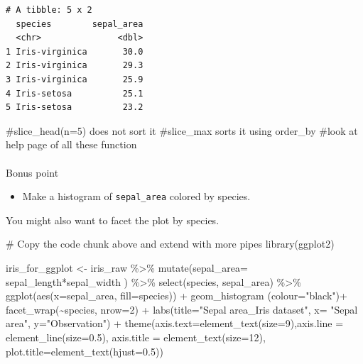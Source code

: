 \documentclass[
  letterpaper,
  DIV=11,
  numbers=noendperiod]{scrartcl}
\makeatletter
\let\oldparagraph\paragraph
\renewcommand{\paragraph}{
    \@ifstar
      \xxxParagraphStar
      \xxxParagraphNoStar
  }
\newcommand{\xxxParagraphStar}[1]{\oldparagraph*{#1}\mbox{}}
\newcommand{\xxxParagraphNoStar}[1]{\oldparagraph{#1}\mbox{}}
\newenvironment{Shaded}{\begin{snugshade}}{\end{snugshade}}
\newcommand{\AttributeTok}[1]{\textcolor[rgb]{0.40,0.45,0.13}{#1}}
\newcommand{\CommentTok}[1]{\textcolor[rgb]{0.37,0.37,0.37}{#1}}
\newcommand{\DecValTok}[1]{\textcolor[rgb]{0.68,0.00,0.00}{#1}}
\newcommand{\FloatTok}[1]{\textcolor[rgb]{0.68,0.00,0.00}{#1}}
\newcommand{\FunctionTok}[1]{\textcolor[rgb]{0.28,0.35,0.67}{#1}}
\newcommand{\NormalTok}[1]{\textcolor[rgb]{0.00,0.23,0.31}{#1}}
\newcommand{\OtherTok}[1]{\textcolor[rgb]{0.00,0.23,0.31}{#1}}
\newcommand{\SpecialCharTok}[1]{\textcolor[rgb]{0.37,0.37,0.37}{#1}}
\newcommand{\StringTok}[1]{\textcolor[rgb]{0.13,0.47,0.30}{#1}}
\providecommand{\tightlist}{%
  \setlength{\itemsep}{0pt}\setlength{\parskip}{0pt}}\usepackage{longtable,booktabs,array}
\makeatother
\begin{document}
\begin{verbatim}
# A tibble: 5 x 2
  species        sepal_area
  <chr>               <dbl>
1 Iris-virginica       30.0
2 Iris-virginica       29.3
3 Iris-virginica       25.9
4 Iris-setosa          25.1
5 Iris-setosa          23.2
\end{verbatim}

\begin{Shaded}
\begin{Highlighting}[]
\CommentTok{\#slice\_head(n=5) does not sort it}
\CommentTok{\#slice\_max sorts it using order\_by}
\CommentTok{\#look at help page of all these function}
\end{Highlighting}
\end{Shaded}

\paragraph{Bonus point}\label{bonus-point}

\begin{itemize}
\tightlist
\item
  Make a histogram of \texttt{sepal\_area} colored by species.
\end{itemize}

You might also want to facet the plot by species.

\begin{Shaded}
\begin{Highlighting}[]
\CommentTok{\# Copy the code chunk above and extend with more pipes}
\FunctionTok{library}\NormalTok{(ggplot2)}

\NormalTok{iris\_for\_ggplot }\OtherTok{\textless{}{-}}\NormalTok{ iris\_raw }\SpecialCharTok{\%\textgreater{}\%}
  \FunctionTok{mutate}\NormalTok{(}\AttributeTok{sepal\_area=}\NormalTok{ sepal\_length}\SpecialCharTok{*}\NormalTok{sepal\_width ) }\SpecialCharTok{\%\textgreater{}\%} 
  \FunctionTok{select}\NormalTok{(species, sepal\_area) }\SpecialCharTok{\%\textgreater{}\%} 
  \FunctionTok{ggplot}\NormalTok{(}\FunctionTok{aes}\NormalTok{(}\AttributeTok{x=}\NormalTok{sepal\_area, }\AttributeTok{fill=}\NormalTok{species)) }\SpecialCharTok{+} 
  \FunctionTok{geom\_histogram}\NormalTok{ (}\AttributeTok{colour=}\StringTok{"black"}\NormalTok{)}\SpecialCharTok{+} 
  \FunctionTok{facet\_wrap}\NormalTok{(}\SpecialCharTok{\textasciitilde{}}\NormalTok{species, }\AttributeTok{nrow=}\DecValTok{2}\NormalTok{) }\SpecialCharTok{+}
  \FunctionTok{labs}\NormalTok{(}\AttributeTok{title=}\StringTok{"Sepal area\_Iris dataset"}\NormalTok{, }\AttributeTok{x=} \StringTok{"Sepal area"}\NormalTok{, }\AttributeTok{y=}\StringTok{"Observation"}\NormalTok{) }\SpecialCharTok{+} \FunctionTok{theme}\NormalTok{(}\AttributeTok{axis.text=}\FunctionTok{element\_text}\NormalTok{(}\AttributeTok{size=}\DecValTok{9}\NormalTok{),}\AttributeTok{axis.line =} \FunctionTok{element\_line}\NormalTok{(}\AttributeTok{size=}\FloatTok{0.5}\NormalTok{), }\AttributeTok{axis.title =} \FunctionTok{element\_text}\NormalTok{(}\AttributeTok{size=}\DecValTok{12}\NormalTok{), }\AttributeTok{plot.title=}\FunctionTok{element\_text}\NormalTok{(}\AttributeTok{hjust=}\FloatTok{0.5}\NormalTok{))}
\end{Highlighting}
\end{Shaded}
\end{document}
